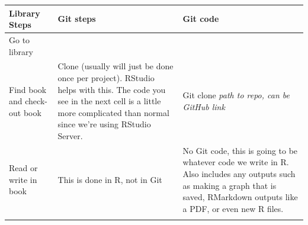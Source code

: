 \documentclass[
  12pt,
]{book}
\begin{document}
\begin{longtable}[]{@{}lll@{}}
\toprule
\begin{minipage}[b]{0.30\columnwidth}\raggedright
Library Steps\strut
\end{minipage} & \begin{minipage}[b]{0.30\columnwidth}\raggedright
Git steps\strut
\end{minipage} & \begin{minipage}[b]{0.30\columnwidth}\raggedright
Git code\strut
\end{minipage}\tabularnewline
\midrule
\endhead
\begin{minipage}[t]{0.30\columnwidth}\raggedright
Go to library\strut
\end{minipage} & \begin{minipage}[t]{0.30\columnwidth}\raggedright
\strut
\end{minipage} & \begin{minipage}[t]{0.30\columnwidth}\raggedright
\strut
\end{minipage}\tabularnewline
\begin{minipage}[t]{0.30\columnwidth}\raggedright
Find book and check-out book\strut
\end{minipage} & \begin{minipage}[t]{0.30\columnwidth}\raggedright
Clone (usually will just be done once per project). RStudio helps with this. The code you see in the next cell is a little more complicated than normal since we're using RStudio Server.\strut
\end{minipage} & \begin{minipage}[t]{0.30\columnwidth}\raggedright
Git clone \emph{path to repo, can be GitHub link}\strut
\end{minipage}\tabularnewline
\begin{minipage}[t]{0.30\columnwidth}\raggedright
Read or write in book\strut
\end{minipage} & \begin{minipage}[t]{0.30\columnwidth}\raggedright
This is done in R, not in Git\strut
\end{minipage} & \begin{minipage}[t]{0.30\columnwidth}\raggedright
No Git code, this is going to be whatever code we write in R. Also includes any outputs such as making a graph that is saved, RMarkdown outputs like a PDF, or even new R files.\strut
\end{minipage}\tabularnewline
\begin{minipage}[t]{0.30\columnwidth}\raggedright

\end{minipage}
\end{longtable}
\end{document}
